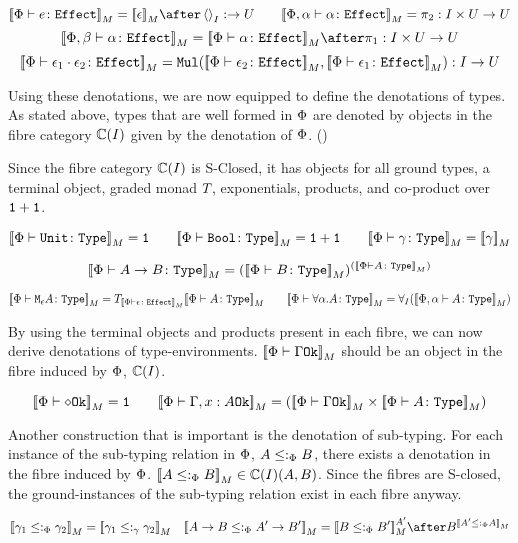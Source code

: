 \documentclass{Report}
\begin{document}
\[
    \deno{\typerelation{\P}{e}{\effect}} = \deno{\e} \after \term{I}: \rightarrow U
    \quad\quad
    \deno{\typerelation{\P,\a}{\a}{\effect}} = \pp: I\times U \rightarrow U
\]\[
    \deno{\typerelation{\P, \b}{\a}{\effect}} = \deno{\typerelation{\P}{\a}{\effect}}\after\p: I\times U\rightarrow U
\]\[
    \deno{\typerelation{\P}{\e_1\dot \e_2}{\effect}} = \Mul(\deno{\typerelation{\P}{\e_2}{\effect}},\deno{\typerelation{\P}{\e_1}{\effect}}): I \rightarrow U
\]

Using these denotations, we are now equipped to define the denotations of types. As stated above, types that are well formed in $\P$ are denoted by objects in the fibre category $\C(I)$ given by the denotation of $\P$. () 

Since the fibre category $\C(I)$ is S-Closed, it has objects for all ground types, a terminal object, graded monad $\T{}{}$, exponentials, products, and co-product over $\1+\1$.

\[
    \deno{\typerelation{\P}{\U}{\type}} = \1
    \quad\quad
    \deno{\typerelation{\P}{\B}{\type}} = \1+\1
    \quad\quad
    \deno{\typerelation{\P}{\g}{\type}} = \deno{\g}
\] 

\[
    \deno{\typerelation{\P}{\ab}{\type}} = (\deno{\typerelation{\P}{B}{\type}})^{(\deno{\typerelation{\P}{A}{\type}})}
\]

\[
    \deno{\typerelation{\P}{\mea}{\type}} =\T{\deno{\typerelation{\P}{\e}{\effect}}}{\deno{\typerelation{\P}{A}{\type}}}
    \quad\quad
    \deno{\typerelation{\P}{\all{\a}{A}}{\type}} =\allI(\deno{\typerelation{\P,\a}{A}{\type}})
\]


By using the terminal objects and products present in each fibre, we can now derive denotations of type-environments. $\deno{\oke{\P}{\G}}$ should be an object in the fibre induced by $\P$, $\C(I)$.

\[
    \deno{\wellformedok{\P}{\nil}} = \1
    \quad\quad
    \deno{\wellformedok{\P}{\gax}} = (\deno{\wellformedok{\P}{\G}} \times \deno{\typerelation{\P}{A}{\type}})
\]

Another construction that is important is the denotation of sub-typing. For each instance of the sub-typing relation in $\P$, $A\subtypep B$, there exists a denotation in the fibre induced by $\P$. $\deno{A\subtypep B} \in\C(I)(A, B)$. Since the fibres are S-closed, the ground-instances of the sub-typing relation exist in each fibre anyway.


\[
    \deno{\g_1\subtypep \g_2} = \deno{\g_1\subtypeg \g_2}
    \quad
    \deno{\ab \subtypep \fntype{A'}{B'}} = \deno{B\subtypep B'}^{A'}\after B^{\deno{A'\subtypep A}}
\]
\end{document}
